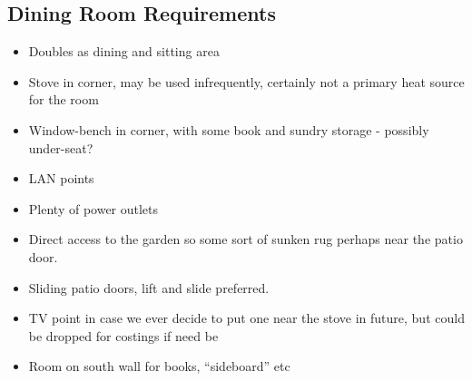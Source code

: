 \subsection{Dining Room Requirements}
\begin{itemize}
\item Doubles as dining and sitting area
\item Stove in corner, may be used infrequently, certainly not a primary heat source for the room
\item Window-bench in corner, with some book and sundry storage - possibly under-seat?
\item LAN points
\item Plenty of power outlets
\item Direct access to the garden so some sort of sunken rug perhaps near the patio door.
\item Sliding patio doors, lift and slide preferred.
\item TV point in case we ever decide to put one near the stove in future, but could be dropped for costings if need be
\item Room on south wall for books, ``sideboard'' etc

\end{itemize}
